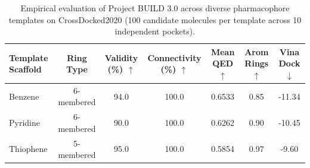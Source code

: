 
\begin{table}[t]
\centering
\small
\caption{Empirical evaluation of Project BUILD 3.0 across diverse pharmacophore templates on CrossDocked2020 (100 candidate molecules per template across 10 independent pockets).}
\label{tab:scaffold_generalization_large_scale}
\begin{tabular}{lcccccc}
\toprule
\textbf{Template Scaffold} & \textbf{Ring Type} & \textbf{Validity (\%)} $\uparrow$ & \textbf{Connectivity (\%)} $\uparrow$ & \textbf{Mean QED} $\uparrow$ & \textbf{Arom Rings} $\uparrow$ & \textbf{Vina Dock} $\downarrow$ \\
\midrule
Benzene & 6-membered & 94.0 & 100.0 & 0.6533 & 0.85 & -11.34 \\
Pyridine & 6-membered & 90.0 & 100.0 & 0.6262 & 0.90 & -10.45 \\
Thiophene & 5-membered & 95.0 & 100.0 & 0.5854 & 0.97 & -9.60 \\
\bottomrule
\end{tabular}
\end{table}
